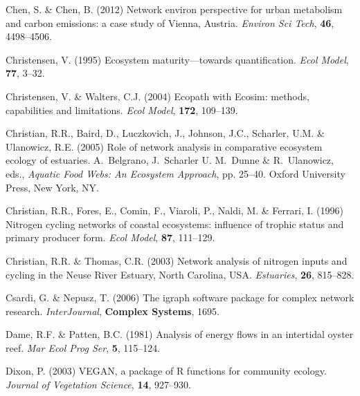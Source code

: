 \documentclass[11pt]{article}
\begin{document}
\begin{thebibliography}{75}
Chen, S. \& Chen, B. (2012) Network environ perspective for urban metabolism
  and carbon emissions: a case study of {Vienna, A}ustria.
\newblock \emph{Environ Sci Tech}, \textbf{46}, 4498--4506.

Christensen, V. (1995) Ecosystem maturity---towards quantification.
\newblock \emph{Ecol Model}, \textbf{77}, 3--32.

Christensen, V. \& Walters, C.J. (2004) Ecopath with {E}cosim: methods,
  capabilities and limitations.
\newblock \emph{Ecol Model}, \textbf{172}, 109--139.

Christian, R.R., Baird, D., Luczkovich, J., Johnson, J.C., Scharler, U.M. \&
  Ulanowicz, R.E. (2005) Role of network analysis in comparative ecosystem
  ecology of estuaries.
\newblock A.~Belgrano, J.~Scharler U. M.~Dunne \& R.~Ulanowicz, eds.,
  \emph{Aquatic Food Webs: An Ecosystem Approach}, pp. 25--40. Oxford
  University Press, New York, NY.

Christian, R.R., Fores, E., Comin, F., Viaroli, P., Naldi, M. \& Ferrari, I.
  (1996) Nitrogen cycling networks of coastal ecosystems: influence of trophic
  status and primary producer form.
\newblock \emph{Ecol Model}, \textbf{87}, 111--129.

Christian, R.R. \& Thomas, C.R. (2003) Network analysis of nitrogen inputs and
  cycling in the {Neuse River Estuary, North Carolina, USA}.
\newblock \emph{Estuaries}, \textbf{26}, 815--828.

Csardi, G. \& Nepusz, T. (2006) The igraph software package for complex network
  research.
\newblock \emph{InterJournal}, \textbf{Complex Systems}, 1695.

Dame, R.F. \& Patten, B.C. (1981) Analysis of energy flows in an intertidal
  oyster reef.
\newblock \emph{Mar Ecol Prog Ser}, \textbf{5}, 115--124.

Dixon, P. (2003) {VEGAN}, a package of {R} functions for community ecology.
\newblock \emph{Journal of Vegetation Science}, \textbf{14}, 927--930.


\end{thebibliography}
\end{document}
